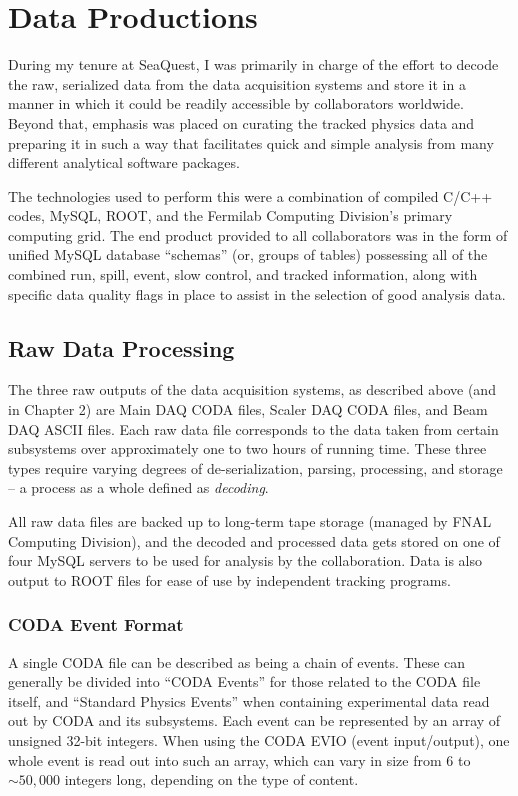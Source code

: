 \chapter{Data Productions}

During my tenure at SeaQuest, I was primarily in charge of the effort to decode the raw, serialized data from the data acquisition systems and store it in a manner in which it could be readily accessible by collaborators worldwide. Beyond that, emphasis was placed on curating the tracked physics data and preparing it in such a way that facilitates quick and simple analysis from many different analytical software packages.

The technologies used to perform this were a combination of compiled C/C++ codes, MySQL, ROOT, and the Fermilab Computing Division's primary computing grid. The end product provided to all collaborators was in the form of unified MySQL database ``schemas'' (or, groups of tables) possessing all of the combined run, spill, event, slow control, and tracked information, along with specific data quality flags in place to assist in the selection of good analysis data.

\section{Raw Data Processing}

The three raw outputs of the data acquisition systems, as described above (and in Chapter 2) are Main DAQ CODA files, Scaler DAQ CODA files, and Beam DAQ ASCII files. Each raw data file corresponds to the data taken from certain subsystems over approximately one to two hours of running time. These three types require varying degrees of de-serialization, parsing, processing, and storage -- a process as a whole defined as \emph{decoding}. 

All raw data files are backed up to long-term tape storage (managed by FNAL Computing Division), and the decoded and processed data gets stored on one of four MySQL servers to be used for analysis by the collaboration. Data is also output to ROOT files for ease of use by independent tracking programs.

\subsection{CODA Event Format}

A single CODA file can be described as being a chain of events. These can generally be divided into ``CODA Events'' for those related to the CODA file itself, and ``Standard Physics Events'' when containing experimental data read out by CODA and its subsystems. Each event can be represented by an array of unsigned 32-bit integers. When using the CODA EVIO (event input/output), one whole event is read out into such an array, which can vary in size from 6 to $\sim50,000$ integers long, depending on the type of content.

